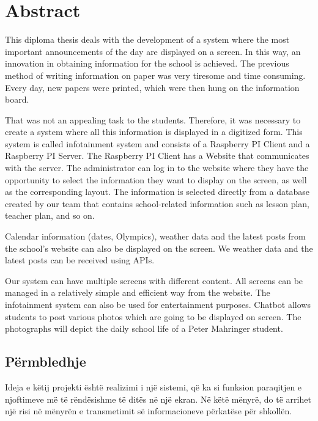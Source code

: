 \chapter*{Abstract}


This diploma thesis deals with the development of a system where the most important announcements of the day are displayed on a screen. In this way, an innovation in obtaining information for the school is achieved. The previous method of writing information on paper was very tiresome and time consuming. Every day, new papers were printed, which were then hung on the information board.  

That was not an appealing task to the students. Therefore, it was necessary to create a system where all this information is displayed in a digitized form. This system is called infotainment system and consists of a Raspberry PI Client and a Raspberry PI Server. The Raspberry PI Client has a Website that communicates with the server. The administrator can log in to the website where they have the opportunity to select the information they want to display on the screen, as well as the corresponding layout. The information is selected directly from a database created by our team that contains school-related information such as lesson plan, teacher plan, and so on.  

Calendar information (dates, Olympics), weather data and the latest posts from the school's website can also be displayed on the screen. We weather data and the latest posts can be received using APIs.  

Our system can have multiple screens with different content. All screens can be managed in a relatively simple and efficient way from the website. The infotainment system can also be used for entertainment purposes. Chatbot allows students to post various photos which are going to be displayed on screen. The photographs will depict the daily school life of a Peter Mahringer student.

\section*{P\"{e}rmbledhje}

Ideja e k\"{e}tij projekti \"{e}sht\"{e} realizimi i nj\"{e} sistemi, q\"{e} ka si funksion paraqitjen e njoftimeve m\"{e} t\"{e} r\"{e}nd\"{e}sishme t\"{e} dit\"{e}s n\"{e} nj\"{e} ekran. N\"{e} k\"{e}t\"{e} m\"{e}nyr\"{e}, do t\"{e} arrihet nj\"{e} risi n\"{e} m\"{e}nyr\"{e}n e transmetimit s\"{e} informacioneve p\"{e}rkat\"{e}se p\"{e}r shkoll\"{e}n. 


